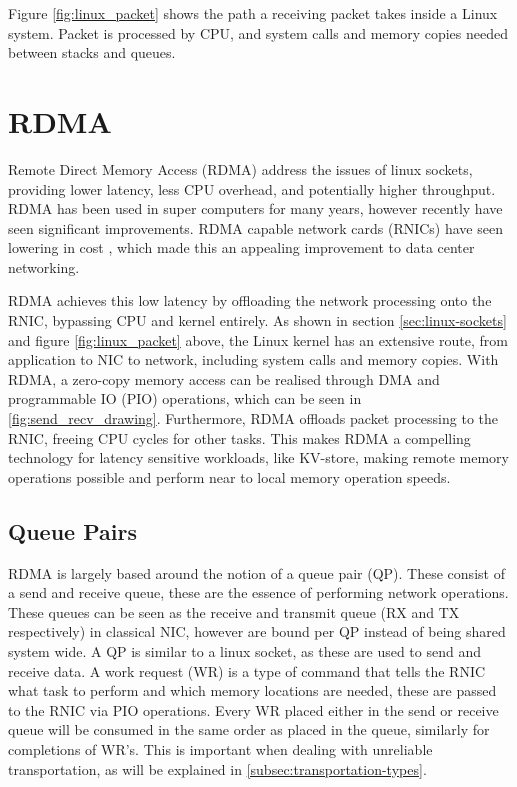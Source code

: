 Figure \ref{fig:linux_packet} shows the path a receiving packet takes inside a Linux system.
Packet is processed by CPU, and system calls and memory copies needed between stacks and queues.

\section[RDMA]{RDMA}\label{sec:rdma}
Remote Direct Memory Access (RDMA) address the issues of linux sockets, providing lower latency, less CPU overhead, and potentially higher throughput.
RDMA has been used in super computers for many years, however recently have seen significant improvements.
RDMA capable network cards (RNICs) have seen lowering in cost \cite{kalia2016design}, which made this an appealing improvement to data center networking.

RDMA achieves this low latency by offloading the network processing onto the RNIC, bypassing CPU and kernel entirely.
As shown in section \ref{sec:linux-sockets} and figure \ref{fig:linux_packet} above, the Linux kernel has an extensive route, from application to NIC to network, including system calls and memory copies.
With RDMA, a zero-copy memory access can be realised through DMA and programmable IO (PIO) operations, which can be seen in \ref{fig:send_recv_drawing}.
Furthermore, RDMA offloads packet processing to the RNIC, freeing CPU cycles for other tasks.
This makes RDMA a compelling technology for latency sensitive workloads, like KV-store, making remote memory operations possible and perform near to local memory operation speeds.

\subsection{Queue Pairs}\label{subsec:queue-pairs}
RDMA is largely based around the notion of a queue pair (QP).
These consist of a send and receive queue, these are the essence of performing network operations.
These queues can be seen as the receive and transmit queue (RX and TX respectively) in classical NIC, however are bound per QP instead of being shared system wide.
A QP is similar to a linux socket, as these are used to send and receive data.
A work request (WR) is a type of command that tells the RNIC what task to perform and which memory locations are needed, these are passed to the RNIC via PIO operations.
Every WR placed either in the send or receive queue will be consumed in the same order as placed in the queue, similarly for completions of WR's.
This is important when dealing with unreliable transportation, as will be explained in \ref{subsec:transportation-types}.

